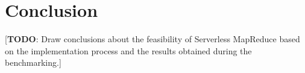 \section{Conclusion}

[\textbf{TODO}: Draw conclusions about the feasibility of Serverless MapReduce based on the implementation process and the results obtained during the benchmarking.]
